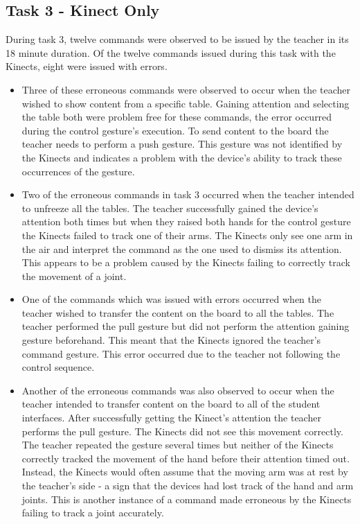 \documentclass[manuscript, review, screen]{acmart}
\begin{document}
\subsection{Task 3 - Kinect Only}
\label{sec:results:task3}  

During task 3, twelve commands were observed to be issued by the teacher in its 18 minute duration.
Of the twelve commands issued during this task with the Kinects, eight were issued with errors.

\begin{itemize}
\item Three of these erroneous commands were observed to occur when the teacher wished to show content from a specific table.
Gaining attention and selecting the table both were problem free for these commands, the error occurred during the control gesture's execution.
To send content to the board the teacher needs to perform a push gesture.
This gesture was not identified by the Kinects and indicates a problem with the device's ability to track these occurrences of the gesture.

\item Two of the erroneous commands in task 3 occurred when the teacher intended to unfreeze all the tables.
The teacher successfully gained the device's attention both times but when they raised both hands for the control gesture the Kinects failed to track one of their arms.
The Kinects only see one arm in the air and interpret the command as the one used to dismiss its attention.
This appears to be a problem caused by the Kinects failing to correctly track the movement of a joint.

\item One of the commands which was issued with errors occurred when the teacher wished to transfer the content on the board to all the tables.
The teacher performed the pull gesture but did not perform the attention gaining gesture beforehand.
This meant that the Kinects ignored the teacher's command gesture.
This error occurred due to the teacher not following the control sequence.

\item Another of the erroneous commands was also observed to occur when the teacher intended to transfer content on the board to all of the student interfaces.
After successfully getting the Kinect's attention the teacher performs the pull gesture.
The Kinects did not see this movement correctly.
The teacher repeated the gesture several times but neither of the Kinects correctly tracked the movement of the hand before their attention timed out.
Instead, the Kinects would often assume that the moving arm was at rest by the teacher's side - a sign that the devices had lost track of the hand and arm joints.
This is another instance of a command made erroneous by the Kinects failing to track a joint accurately.


\end{itemize}
\end{document}
